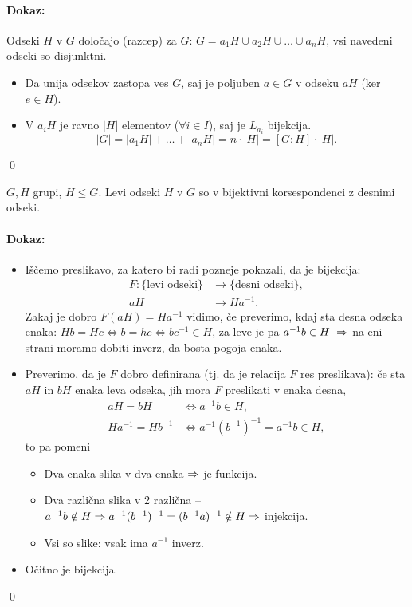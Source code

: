 \paragraph{Dokaz:}
Odseki $H$ v $G$ dolo\v cajo (razcep) za $G$: $G = a_1 H\cup a_2 H \cup \ldots \cup a_n H$, vsi navedeni odseki so disjunktni.
\begin{itemize}
	\item{Da unija odsekov zastopa ves $G$, saj je poljuben $a \in G$ v odseku $aH$ (ker $e \in H$).}
	\item{V $a_i H$ je ravno $|H|$ elementov ($\forall i\in I$), saj je $L_{a_i}$ bijekcija.
		\[
			|G| = |a_1 H| + \ldots + |a_n H| = n \cdot |H| = [G:H] \cdot |H|.
		\]}
\end{itemize}
\qed

\begin{trditev}
	$G,H$ grupi, $H \leq G$. Levi odseki $H$ v $G$ so v bijektivni korsespondenci z desnimi odseki.
\end{trditev}

\paragraph{Dokaz:}
\begin{itemize}
	\item{I\v s\v cemo preslikavo, za katero bi radi pozneje pokazali, da je bijekcija:
	\begin{align*}
		F:\{\text{levi odseki}\} &\to \{\text{desni odseki}\}, \\
		aH &\to Ha^{-1}.
	\end{align*}
	Zakaj je dobro $F(aH) = Ha^{-1}$ vidimo, \v ce preverimo, kdaj sta desna odseka enaka: $Hb = Hc
	\iff b = hc \iff bc^{-1} \in H$, za leve je pa $a^{-1}b \in H\ \Rightarrow$ na eni strani moramo dobiti
	inverz, da bosta pogoja enaka.}
	\item{Preverimo, da je $F$ dobro definirana (tj. da je relacija $F$ res preslikava): \v ce sta $aH$
	in $bH$ enaka leva odseka, jih mora $F$ preslikati v enaka desna,
	\begin{align*}
		aH = bH &\iff a^{-1}b \in H, \\
		Ha^{-1} = Hb^{-1} &\iff a^{-1}(b^{-1})^{-1} = a^{-1} b \in H,
	\end{align*}
	to pa pomeni
	\begin{itemize}	
		\item{Dva enaka slika v dva enaka $\Rightarrow$ je funkcija.}
		\item{Dva razli\v cna slika v 2 razli\v cna -- $a^{-1}b \notin H \Rightarrow a^{-1}(b^{-1})^{-1} =
			(b^{-1}a)^{-1} \notin H \Rightarrow$ injekcija.}
		\item{Vsi so slike: vsak ima $a^{-1}$ inverz.}
	\end{itemize}}
	\item{O\v citno je bijekcija.}
\end{itemize}
\qed

